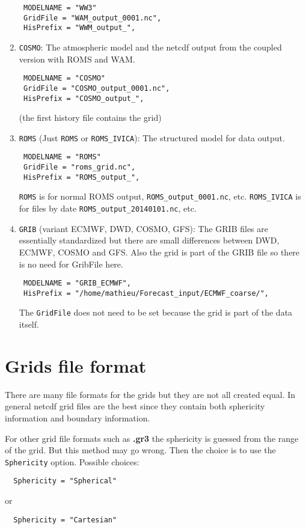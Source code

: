 \documentclass[12pt]{amsart}
\begin{document}
\begin{enumerate}
\begin{verbatim}
 MODELNAME = "WW3"
 GridFile = "WAM_output_0001.nc",
 HisPrefix = "WWM_output_",
\end{verbatim}
\item {\tt COSMO}: The atmospheric model and the netcdf output from the coupled version with ROMS and WAM.
\begin{verbatim}
 MODELNAME = "COSMO"
 GridFile = "COSMO_output_0001.nc",
 HisPrefix = "COSMO_output_",
\end{verbatim}
(the first history file contains the grid)
\item {\tt ROMS} (Just {\tt ROMS} or {\tt ROMS\_IVICA}): The structured model for data output.
\begin{verbatim}
 MODELNAME = "ROMS"
 GridFile = "roms_grid.nc",
 HisPrefix = "ROMS_output_",
\end{verbatim}
{\tt ROMS} is for normal ROMS output, {\tt ROMS\_output\_0001.nc}, etc. {\tt ROMS\_IVICA} is for files by date {\tt ROMS\_output\_20140101.nc}, etc.
\item {\tt GRIB} (variant ECMWF, DWD, COSMO, GFS): The GRIB files are essentially standardized but there are small differences between DWD, ECMWF, COSMO and GFS. Also the grid is part of the GRIB file so there is no need for GribFile here.
\begin{verbatim}
 MODELNAME = "GRIB_ECMWF", 
 HisPrefix = "/home/mathieu/Forecast_input/ECMWF_coarse/", 
\end{verbatim}
The {\tt GridFile} does not need to be set because the grid is part of the data itself.
\end{enumerate}


\section{Grids file format}
There are many file formats for the grids but they are not all created equal.
In general netcdf grid files are the best since they contain both sphericity information
and boundary information.

For other grid file formats such as {\bf .gr3} the sphericity is guessed from the range
of the grid. But this method may go wrong. Then the choice is to use the {\tt Sphericity}
option. Possible choices:
\begin{verbatim}
  Sphericity = "Spherical"
\end{verbatim}
or
\begin{verbatim}
  Sphericity = "Cartesian"
\end{verbatim}
\end{document}

